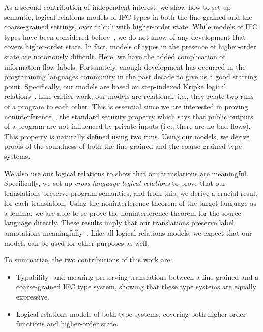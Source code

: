 As a second contribution of independent interest, we show how to set
up semantic, logical relations models of IFC types in both the
fine-grained and the coarse-grained settings, over calculi with
higher-order state. While models of IFC types have been considered
before~\cite{popl98-SLAM,popl99-DCC,esop99-PER-IFC,DBLP:conf/csfw/MantelSS11},
we do not know of any development that covers higher-order state.  In
fact, models of types in the presence of higher-order state are
notoriously difficult. Here, we have the added complication of
information flow labels. Fortunately, enough development has occurred
in the programming languages community in the past decade to give us a
good starting point. Specifically, our models are based on
step-indexed Kripke logical
relations~\cite{DBLP:conf/popl/AhmedDR09}. Like earlier work, our
models are relational, i.e., they relate two runs of a program to each
other. This is essential since we are interested in proving
noninterference~\cite{goguen82:ni}, the standard security property
which says that public outputs of a program are not influenced by
private inputs (i.e., there are no bad flows). This property is
naturally defined using two runs. Using our models, we derive proofs
of the soundness of both the fine-grained and the coarse-grained type
systems.


We also use our logical relations to show that our translations are
meaningful. Specifically, we set up \emph{cross-language logical
  relations} to prove that our translations preserve program
semantics, and from this, we derive a crucial result for each
translation: Using the noninterference theorem of the target language
as a lemma, we are able to re-prove the noninterference theorem for
the source language directly. These results imply that our
translations preserve label annotations
meaningfully~\cite{DBLP:journals/cl/BartheRB07}. Like all logical
relations models, we expect that our models can be used for other
purposes as well.

To summarize, the two contributions of this work are:
\begin{itemize}
\item Typability- and meaning-preserving translations between a
  fine-grained and a coarse-grained IFC type system, showing that
  these type systems are equally expressive.
\item Logical relations models of both type systems, covering both
  higher-order functions and higher-order state.
\end{itemize}


